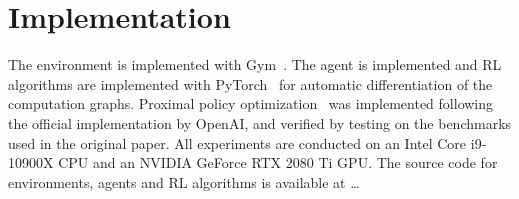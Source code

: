 \section{Implementation}

The environment is implemented with Gym~\cite{brockman_gym_2016}. The agent is implemented and RL algorithms are implemented with PyTorch~\cite{paszke_pytorch_nodate} for automatic differentiation of the computation graphs.
Proximal policy optimization~\cite{schulman_ppo_2017} was implemented following the official implementation by OpenAI,
and verified by testing on the benchmarks used in the original paper.
All experiments are conducted on an Intel Core i9-10900X CPU and an NVIDIA GeForce RTX 2080 Ti GPU.
The source code for environments, agents and RL algorithms is available at \dots
{}







